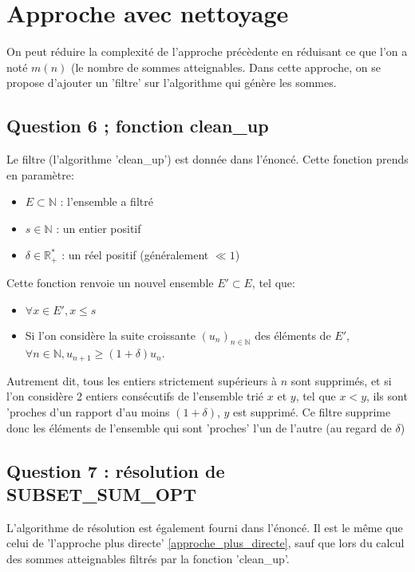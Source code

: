 \documentclass[10pt]{article}
\begin{document}
	\newpage
		\section{Approche avec nettoyage}\label{approche_naive}
			On peut réduire la complexité de l'approche précèdente en réduisant ce que l'on a noté $m(n)$ (le nombre de sommes atteignables.
			Dans cette approche, on se propose d'ajouter un 'filtre' sur l'algorithme qui génère les sommes.
				\subsection{Question 6 ; fonction clean\_up}
					Le filtre (l'algorithme 'clean\_up') est donnée dans l'énoncé. Cette fonction prends en paramètre:
					\begin{itemize}[label=-]
						\setlength\itemsep{0.1em}
						\item $E \subset \mathbb{N}$ : l'ensemble a filtré
						\item $s \in \mathbb{N}$ : un entier positif
						\item $\delta \in \mathbb{R}_+^*$ : un réel positif (généralement $\ll 1$)
					\end{itemize}
					Cette fonction renvoie un nouvel ensemble $E' \subset E$, tel que:
					\begin{itemize}[label=-]
						\setlength\itemsep{0.1em}
						\item	$\forall x \in E' , x \leq s$
						\item	Si l'on considère la suite croissante $(u_n)_{n \in \mathbb{N}}$ des éléments de $E'$,
								$\forall n \in \mathbb{N}, u_{n + 1} \geq (1 + \delta)u_n $.
					\end{itemize}
		
					Autrement dit, tous les entiers strictement supérieurs à $n$ sont supprimés, et 
					si l'on considère 2 entiers consécutifs de l'ensemble trié $x$ et $y$, tel que $x < y$,
					ils sont 'proches d'un rapport d'au moins $(1 + \delta)$, $y$ est supprimé.
					Ce filtre supprime donc les éléments de l'ensemble qui sont 'proches' l'un de l'autre (au regard de $\delta$)

				\subsection{Question 7 : résolution de SUBSET\_SUM\_OPT}
					L'algorithme de résolution est également fourni dans l'énoncé.
					Il est le même que celui de 'l'approche plus directe' \ref{approche_plus_directe}, sauf que
					lors du calcul des sommes atteignables filtrés par la fonction 'clean\_up'.
					
\end{document}
